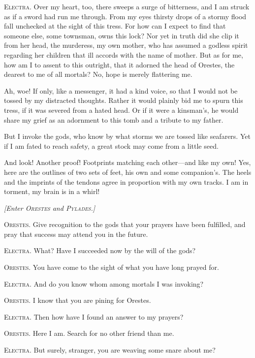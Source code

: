 \documentclass[12pt]{article}
\begin{document}
\textsc{Electra.} Over my heart, too, there sweeps a surge of bitterness, and I am struck as if a sword had run me through. From my eyes thirsty drops of a stormy flood fall unchecked at the sight of this tress. For how can I expect to find that someone else, some townsman, owns this lock? Nor yet in truth did she clip it from her head, the murderess, my own mother, who has assumed a godless spirit regarding her children that ill accords with the name of mother. But as for me, how am I to assent to this outright, that it adorned the head of Orestes, the dearest to me of all mortals? No, hope is merely flattering me.

Ah, woe! If only, like a messenger, it had a kind voice, so that I would not be tossed by my distracted thoughts. Rather it would plainly bid me to spurn this tress, if it was severed from a hated head. Or if it were a kinsman's, he would share my grief as an adornment to this tomb and a tribute to my father.

But I invoke the gods, who know by what storms we are tossed like seafarers. Yet if I am fated to reach safety, a great stock may come from a little seed.

And look! Another proof! Footprints matching each other---and like my own! Yes, here are the outlines of two sets of feet, his own and some companion's. The heels and the imprints of the tendons agree in proportion with my own tracks. I am in torment, my brain is in a whirl!

\begin{center}
\textit{[Enter \textsc{Orestes} and \textsc{Pylades.}]}
\end{center}

\textsc{Orestes.} Give recognition to the gods that your prayers have been fulfilled, and pray that success may attend you in the future.

\textsc{Electra.} What? Have I succeeded now by the will of the gods?

\textsc{Orestes.} You have come to the sight of what you have long prayed for.

\textsc{Electra.} And do you know whom among mortals I was invoking?

\textsc{Orestes.} I know that you are pining for Orestes.

\textsc{Electra.} Then how have I found an answer to my prayers?

\textsc{Orestes.} Here I am. Search for no other friend than me.

\textsc{Electra.} But surely, stranger, you are weaving some snare about me?
\end{document}
